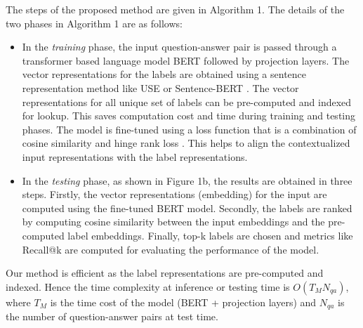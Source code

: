 \documentclass[runningheads, envcountsame, a4paper]{llncs}
\begin{document}
 
The steps of the proposed method are given in Algorithm 1.
The details of the two phases in Algorithm 1 are as follows:
 \setlength{\parindent}{0pt}
\let\labelitemi\labelitemii
\begin{itemize}
  \setlength\itemsep{0.5em}
\item In the \textit{training} phase, the input question-answer pair is passed through a transformer based language model BERT followed by projection layers. The vector representations for the labels are obtained using a sentence representation method like USE \cite{cer-etal-2018-universal} or Sentence-BERT \cite{reimers-gurevych-2019-sentence}. The vector representations for all unique set of labels can be pre-computed and indexed for lookup. This saves computation cost and time during training and testing phases. The model is fine-tuned using a loss function that is a combination of cosine similarity and hinge rank loss \cite{frome2013devise}. This helps to align the contextualized input representations with the label representations.

\item In the \textit{testing} phase, as shown in Figure 1b, the results are obtained in three steps. Firstly, the vector representations (embedding) for the input are computed using the fine-tuned BERT model. Secondly, the labels are ranked by computing cosine similarity between the input embeddings and the pre-computed label embeddings. Finally, top-k labels are chosen and metrics like Recall@k are computed for evaluating the performance of the model.
    \end{itemize}

\setlength{\parindent}{4ex}Our method is efficient as the label representations are pre-computed and indexed. Hence the time complexity at inference or testing time is $O(T_{M}N_{qa})$, where $T_{M}$ is the time cost of the model (BERT + projection layers) and $N_{qa}$ is the number of question-answer pairs at test time.
\end{document}
